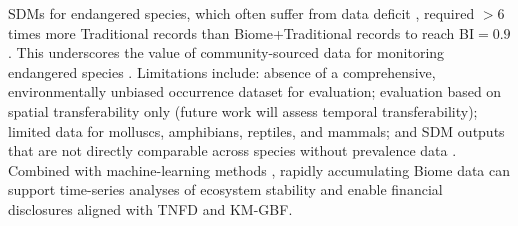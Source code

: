 \documentclass[11pt]{article}
\begin{document}
SDMs for endangered species, which often suffer from data deficit \citep{erickson2023,wisz2008}, required $>6$ times more Traditional records than Biome+Traditional records to reach BI$=0.9$. This underscores the value of community-sourced data for monitoring endangered species \citep{chandler2017,zapponi2017}. Limitations include: absence of a comprehensive, environmentally unbiased occurrence dataset for evaluation; evaluation based on spatial transferability only (future work will assess temporal transferability); limited data for molluscs, amphibians, reptiles, and mammals; and SDM outputs that are not directly comparable across species without prevalence data \citep{elith2011,ward2009}. Combined with machine-learning methods \citep{fink2023}, rapidly accumulating Biome data can support time-series analyses of ecosystem stability and enable financial disclosures aligned with TNFD \citep{tnfd2023} and KM-GBF.



\end{document}
